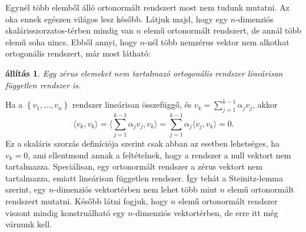 \documentclass[a4paper, showtrims]{memoir}
\makeatletter
\renewenvironment{proof}[1][\proofname]
    {\par\pushQED{\qed}%
    \normalfont \topsep6\p@\@plus6\p@\relax
    \trivlist
    \item[\hskip\labelsep
        \itshape
    #1\@addpunct{:}]\ignorespaces}
    {\popQED\endtrivlist\@endpefalse}
\theoremstyle{plain}
\newtheorem{proposition}{állítás}[chapter]
\theoremstyle{remark}
\theoremstyle{definition}
\newcommand{\ip}[2]{\langle#1,#2\rangle}
\makeatother
\begin{document}
Egynél több elemből álló ortonormált rendszert most nem tudunk mutatni.
Az oka ennek egészen világos lesz később.
Látjuk majd, hogy egy $n$-dimenziós skalárisszorzatos-térben mindig van $n$ elemű ortonormált rendszert, de annál több elemű soha nincs.
Ebből annyi, hogy $n$-nél több nemzérus vektor nem alkothat ortogonális rendszert, már most látható:
\begin{proposition}
	Egy zérus elemeket nem tartalmazó ortogonális rendszer lineárisan független rendszer is.
\end{proposition}
\begin{proof}
	Ha a $\left\{ v_1,\ldots,v_n \right\}$ rendszer lineárisan összefüggő,
	és $v_k=\sum_{j=1}^{k-1}\alpha_jv_j$,
	akkor
	\[
		\ip{v_k}{v_k}
		=
		\ip{\sum_{j=1}^{k-1}\alpha_jv_j}{v_k}
		=
		\sum_{j=1}^{k-1}\alpha_j\ip{v_j}{v_k}
		=0.
	\]
	Ez a skaláris szorzás definíciója szerint csak abban az esetben lehetséges,
	ha $v_k=0$, ami ellentmond annak a feltételnek, hogy a rendszer a null vektort nem tartalmazza.
\end{proof}
Speciálisan, egy ortonormált rendszer a zérus vektort nem tartalmazza,
emiatt lineárisan független rendszer.
Így tehát a Steinitz-lemma szerint,
egy $n$-dimenziós vektortérben nem lehet több mint $n$ elemű ortonormált rendszert mutatni.
Később látni fogjuk,
hogy $n$ elemű ortonormált rendszer viszont mindig konstruálható egy $n$-dimenziós vektortérben,
de erre itt még várnunk kell.
\end{document}
